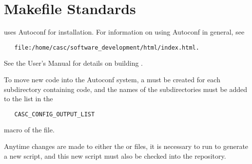 \chapter{Makefile Standards}
\label{Makefile Standards}

\hypre{} uses Autoconf for installation.  For information on using
Autoconf in general, see
\begin{verbatim}
   file:/home/casc/software_development/html/index.html.
\end{verbatim}
See the User's Manual for details on building \hypre{}.

To move new code into the Autoconf system, a  must be
created for each subdirectory containing code, and the names of the
subdirectories must be added to the list in the
\begin{verbatim}
   CASC_CONFIG_OUTPUT_LIST
\end{verbatim}
macro of the  file.

Anytime changes are made to either the  or
 files, it is necessary to run  to
generate a new  script, and this new script must also
be checked into the repository.

